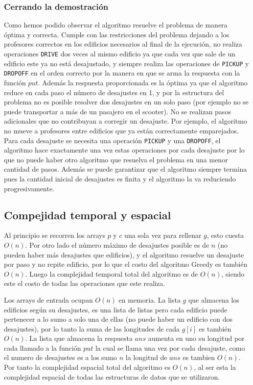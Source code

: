 \documentclass[11pt]{article}
\begin{document}
    \subsubsection{Cerrando la demostración}
    Como hemos podido observar el algoritmo resuelve el problema de manera óptima y correcta. Cumple con las restricciones del
    problema dejando a los profesores correctos en los edificios necesarios al final de la ejecución, no realiza operaciones
    \texttt{DRIVE} dos veces al mismo edificio ya que cada vez que sale de un edificio este ya no está desajustado, y siempre realiza
    las operaciones de \texttt{PICKUP} y \texttt{DROPOFF} en el orden correcto por la manera en que se arma la respuesta con la
    función $put$. Además la respuesta proporcionada es la óptima ya que el algoritmo reduce en cada paso el número de desajustes en 
    1, y por la estructura del problema no es posible resolver dos desajustes en un solo paso (por ejemplo no se puede transportar a 
    más de un pasajero en el scooter). No se realizan pasos adicionales que no contribuyan a corregir un desajuste. Por ejemplo, el 
    algoritmo no mueve a profesores entre edificios que ya están correctamente emparejados. Para cada desajuste se necesita una
    operación \texttt{PICKUP} y una \texttt{DROPOFF}, el algoritmo hace exactamente una vez estas operaciones por cada desajuste
    por lo que no puede haber otro algoritmo que resuelva el problema en una menor cantidad de pasos. Además se puede garantizar
    que el algoritmo siempre termina pues la cantidad inicial de desajustes es finita y el algoritmo la va reduciendo progresivamente.

    \subsection{Compejidad temporal y espacial}
    Al principio se recorren los arrays $p$ y $c$ una sola vez para rellenar $g$, esto cuesta $O(n)$. Por otro lado el número máximo 
    de desajustes posible es de $n$ (no pueden haber más desajustes que edificios), y el algoritmo resuelve un desajuste por paso y no 
    repite edificio, por lo que el costo del algoritmo Greedy es también $O(n)$. Luego la complejidad temporal total del algoritmo es 
    de $O(n)$, siendo este el costo de todas las operaciones que este realiza.

    Los arrays de entrada ocupan $O(n)$ en memoria. La lista $g$ que almacena los edificios según su desajustes, es una
    lista de listas pero cada edificio puede pertenecer a lo sumo a solo una de ellas (no puede haber un edificio con
    dos desajustes), por lo tanto la suma de las longitudes de cada $g[i]$ es también $O(n)$. La lista que almacena la respuesta
    $ans$ aumenta en uno su longitud por cada llamado a la función $put$ la cual se llama una vez por cada desajuste, como el
    numero de desajustes es a los sumo $n$ la longitud de $ans$ es tambien $O(n)$. Por tanto la complejidad espacial total
    del algoritmo es $O(n)$, al ser esta la complejidad espacial de todas las estructuras de datos que se utilizaron.
\end{document}
